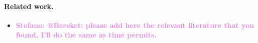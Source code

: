 \documentclass[12pt,a4paper]{article}
\newcommand{\stefano}[1]{{\bf \textcolor{violet}{{Stefano: #1}}}}
\begin{document}
\paragraph{Related work.}

\begin{itemize}

    \item \stefano{@Bereket: please add here the  relevant literature that
        you found, I'll do the same as time permits.}

\end{itemize}
\end{document}
